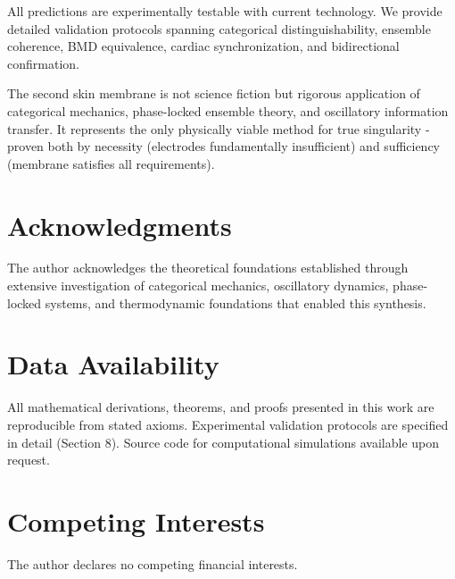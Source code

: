 \documentclass[11pt,a4paper]{article}
\theoremstyle{definition}
\theoremstyle{remark}
\begin{document}
All predictions are experimentally testable with current technology. We provide detailed validation protocols spanning categorical distinguishability, ensemble coherence, BMD equivalence, cardiac synchronization, and bidirectional confirmation.

The second skin membrane is not science fiction but rigorous application of categorical mechanics, phase-locked ensemble theory, and oscillatory information transfer. It represents the only physically viable method for true singularity - proven both by necessity (electrodes fundamentally insufficient) and sufficiency (membrane satisfies all requirements).

\section*{Acknowledgments}

The author acknowledges the theoretical foundations established through extensive investigation of categorical mechanics, oscillatory dynamics, phase-locked systems, and thermodynamic foundations that enabled this synthesis.

\section*{Data Availability}

All mathematical derivations, theorems, and proofs presented in this work are reproducible from stated axioms. Experimental validation protocols are specified in detail (Section 8). Source code for computational simulations available upon request.

\section*{Competing Interests}

The author declares no competing financial interests.
\end{document}
